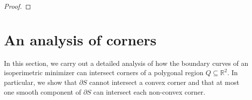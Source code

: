\documentclass[leqno]{article}
\numberwithin{equation}{section}
\theoremstyle{definition}
\theoremstyle{remark}
\theoremstyle{plain}
\begin{document}
\begin{proof}
\bigskip






\end{proof}




\section{An analysis of corners}\label{sec:tools}  In this section, we carry out a detailed analysis of how the boundary curves of an isoperimetric minimizer can intersect corners of a polygonal region $Q\subseteq \mathbb{R}^2$.  In particular, we show that $\partial S$ cannot intersect a convex corner and that at most one smooth component of $\partial S$ can intersect each non-convex corner.  %
\end{document}
